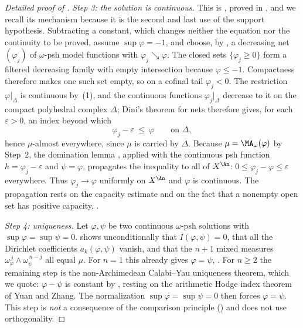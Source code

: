 \begin{proof}[Detailed proof of ]
\emph{Step 3: the solution is continuous.}  This is
, proved in
, and we recall its mechanism because it is the
second and last use of the support hypothesis.  Subtracting a constant,
which changes neither the equation nor the continuity to be proved, assume
$\sup\varphi=-1$, and choose, by
, a decreasing net
$(\varphi_j)$ of $\omega$-psh model functions with
$\varphi_j\searrow\varphi$.  The closed sets $\{\varphi_j\geq0\}$
form a filtered decreasing family with empty intersection because
$\varphi\leq-1$.  Compactness therefore makes one such set empty,
so on a cofinal tail $\varphi_j<0$.  The restriction $\varphi|_\Delta$ is continuous by
\,(1), and the continuous functions
$\varphi_j|_\Delta$ decrease to it on the compact polyhedral complex
$\Delta$; Dini's theorem for nets therefore gives, for each
$\varepsilon>0$, an index beyond which
\[
 \varphi_j-\varepsilon\ \leq\ \varphi
 \qquad\text{on }\Delta ,
\]
hence $\mu$-almost everywhere, since $\mu$ is carried by $\Delta$.
Because $\mu=\MA_\omega(\varphi)$ by Step~2, the domination lemma
, applied with the continuous psh
function $h=\varphi_j-\varepsilon$ and $\psi=\varphi$, propagates the
inequality to all of $X^{\An}$:
$0\leq\varphi_j-\varphi\leq\varepsilon$ everywhere.  Thus
$\varphi_j\to\varphi$ uniformly on $X^{\An}$ and $\varphi$ is
continuous.  The propagation rests on the capacity estimate
 and on the fact that a nonempty open set
has positive capacity, .

\emph{Step 4: uniqueness.}  Let $\varphi,\psi$ be two continuous
$\omega$-psh solutions with $\sup\varphi=\sup\psi=0$.
 shows unconditionally that
$I(\varphi,\psi)=0$, that all the Dirichlet coefficients
$a_k(\varphi,\psi)$ vanish, and that the $n+1$ mixed measures
$\omega_\varphi^{\,j}\wedge\omega_\psi^{\,n-j}$ all equal $\mu$.  For
$n=1$ this already gives $\varphi=\psi$,
.  For $n\geq2$ the remaining step is the
non-Archimedean Calabi--Yau uniqueness theorem, which we quote:
$\varphi-\psi$ is constant by \cite[Proposition~8.2]{BFJ15}, resting on
the arithmetic Hodge index theorem of Yuan and Zhang.  The normalization
$\sup\varphi=\sup\psi=0$ then forces $\varphi=\psi$.  This step is
\emph{not} a consequence of the comparison principle
() and does not use orthogonality.
\end{proof}

